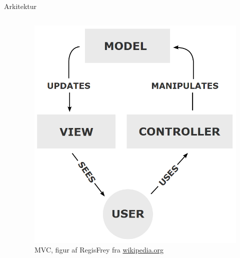 \begin{frame}[t]{Arkitektur}
\begin{columns}[T]
\begin{column}{.48\textwidth}
				\end{column}
				\begin{column}{.48\textwidth}
					\begin{figure}
						\includegraphics[width=1\textwidth]{images/MVC_2.png}
						\caption{MVC, figur af RegisFrey fra \url{wikipedia.org}}
					\end{figure}
				\end{column}
			\end{columns}
		\end{frame}
		
